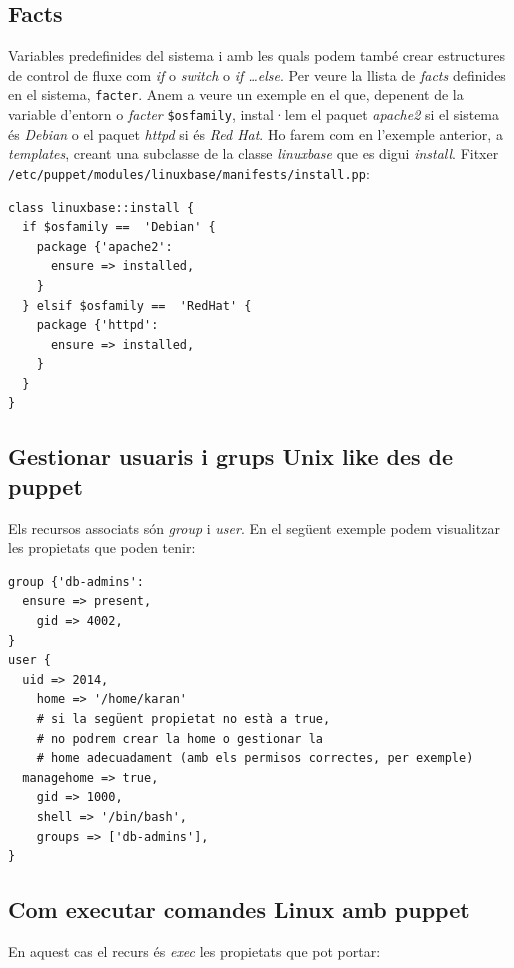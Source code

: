 \documentclass[a4paper]{article}
\begin{document}
\subsection{Facts}
Variables predefinides del sistema i amb les quals podem tamb\'e crear estructures de control de fluxe com \textit{if} o \textit{switch} o \textit{if \ldots else}. Per veure la llista de \textit{facts} definides en el sistema, \verb+facter+. Anem a veure un exemple en el que, depenent de la variable d'entorn o \textit{facter} \verb+$osfamily+, instal·lem el paquet \textit{apache2} si el sistema \'es \textit{Debian} o el paquet \textit{httpd} si \'es \textit{Red Hat}. Ho farem com en l'exemple anterior, a \textit{templates}, creant una subclasse de la classe \textit{linuxbase} que es digui \textit{install}. Fitxer \verb+/etc/puppet/modules/linuxbase/manifests/install.pp+:
\begin{verbatim}
class linuxbase::install {
  if $osfamily ==  'Debian' {
    package {'apache2':
      ensure => installed,
    }
  } elsif $osfamily ==  'RedHat' {
    package {'httpd':
      ensure => installed,
    }
  }
}
\end{verbatim}
\subsection{Gestionar usuaris i grups Unix like des de puppet}
Els recursos associats són \textit{group} i \textit{user}. En el següent exemple podem visualitzar les propietats que poden tenir:
\begin{verbatim}
group {'db-admins':
  ensure => present,
	gid => 4002,
}
user {
  uid => 2014,
	home => '/home/karan'
	# si la següent propietat no està a true, 
	# no podrem crear la home o gestionar la 
	# home adecuadament (amb els permisos correctes, per exemple)
  managehome => true,
	gid => 1000,
	shell => '/bin/bash',
	groups => ['db-admins'],
}
\end{verbatim}

\subsection{Com executar comandes Linux amb puppet}
En aquest cas el recurs \'es \textit{exec} les propietats que pot portar:
\begin{figure}[h]
	\centering
\end{figure}
\end{document}
